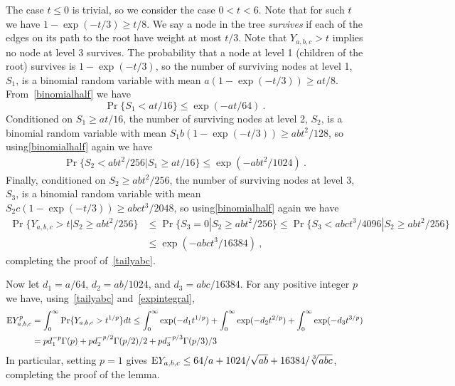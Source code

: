 \documentclass{patmorin}
\begin{document}
The case $t\leq 0$ is trivial, so we consider the case $0< t< 6$.
Note that for such $t$ we have $1-\exp(-t/3)\geq t/8$.
We say a node in the tree \emph{survives} if each of the edges on its path to the root
have weight at most $t/3$.
Note that $Y_{a,b,c}>t$ implies no node at level 3 survives.
The probability that a node at level 1 (children of the root) survives is $1-\exp(-t/3)$,
so the number of surviving nodes at level 1, $S_1$, is a binomial random variable with mean $a(1-\exp(-t/3))\geq at/8$.
From~\eqref{binomialhalf} we have
\[
\Pr\{S_1 < at/16\}
\leq \exp(-at/64)\:.
\]
Conditioned on $S_1\geq at/16$, 
the number of surviving nodes at level 2, $S_2$, is a binomial random variable with mean
$S_1b(1-\exp(-t/3))\geq abt^2/128$, so using\eqref{binomialhalf} again we have
\begin{align*}
\Pr\{S_2<abt^2/256 | S_1\geq at/16\} \leq
\exp(-abt^2/1024)\:.
\end{align*}
Finally, conditioned on $S_2\geq abt^2/256$,
the number of surviving nodes at level 3, $S_3$, is a binomial random variable with mean
$S_2c(1-\exp(-t/3))\geq abct^3/2048$, so using\eqref{binomialhalf} again we have
\begin{align*}
\Pr\{Y_{a,b,c}>t | S_2\geq abt^2/256\}
& \leq
\Pr\{S_3=0 | S_2\geq abt^2/256\}
\leq
\Pr\{S_3<abct^3/4096 | S_2\geq abt^2/256\} \\
& \leq
\exp(-abct^3/16384)\:,
\end{align*}
completing the proof of~\eqref{tailyabc}.

Now let $d_1 = a/64$, $d_2=ab/1024$, and $d_3=abc/16384$.
For any positive integer $p$ we have,
using~\eqref{tailyabc} and~\eqref{expintegral},
\begin{align*}
\mathrm{E} Y_{a,b,c}^p & = \int_0^{\infty} \Pr \{Y_{a,b,c}>t^{1/p}\}dt
\leq
\int_0^{\infty} \exp(-d_1 t^{1/p}) + \int_0^{\infty} \exp(-d_2 t^{2/p})
+ \int_0^{\infty} \exp(-d_3 t^{3/p}) \\
& 
= pd_1^{-p}\Gamma(p)
+ pd_2^{-p/2}\Gamma(p/2)/2
+ pd_3^{-p/3}\Gamma(p/3)/3
\end{align*}
In particular, setting $p=1$ gives $\mathrm{E} Y_{a,b,c} \leq 64/a+1024/\sqrt{ab} + 16384/\sqrt[3]{abc}$, completing the proof of the lemma.

%
%
%
\end{document}
